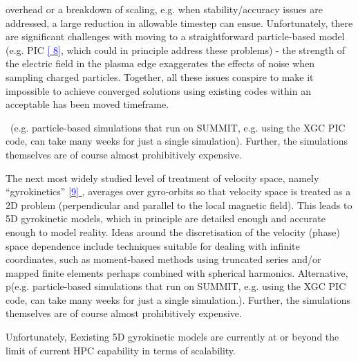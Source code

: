 \documentclass[a4paper]{article}
\newcommand\textstyleInternetlink[1]{\textcolor{blue}{#1}}
\begin{document}
overhead or a breakdown of scaling, e.g.
when stability/accuracy issues are addressed, a large reduction in allowable 
timestep can ensue. Unfortunately, there
are significant challenges with moving to a straightforward particle-based 
{model (e.g. PIC
}\href{https://en.wikipedia.org/wiki/Particle-in-cell}{\textstyleInternetlink{{[
8]}}}{,
which }could in principle address these problems) - the strength of the 
electric field in the plasma edge exaggerates
the effects of noise when sampling charged particles. Together, all these 
issues conspire to make it impossible to
achieve converged solutions using existing codes within an acceptable %
has been moved
timeframe.

\ (e.g. particle-based simulations that run on SUMMIT, e.g. using the XGC PIC 
code, can take many weeks for just a
single simulation). Further, the simulations themselves are of course almost 
prohibitively expensive.


\bigskip

The next most widely studied level of treatment of velocity space, {namely 
``gyrokinetics''
}\href{https://en.wikipedia.org/wiki/Gyrokinetics}{\textstyleInternetlink{{[9]}}
}{,
averages over gyro-orbits so that velocity space is treated as a 2D problem 
(perpendicular and parallel to the local
magnetic field). This leads to 5D gyrokinetic models, which in principle }are 
detailed enough and accurate enough to
model reality. Ideas around the discretisation of the velocity (phase) space 
dependence include techniques suitable for
dealing with infinite coordinates, such as moment-based methods using truncated 
series and/or mapped finite elements
perhaps combined with spherical harmonics. Alternative, p(e.g. particle-based 
simulations that run on SUMMIT, e.g.
using the XGC PIC code, can take many weeks for just a single simulation.). 
Further, the simulations themselves are of
course almost prohibitively expensive.


\bigskip

Unfortunately, Eexisting 5D gyrokinetic models are currently at or beyond the 
limit of current HPC capability in terms
of scalability.


\bigskip
\end{document}
